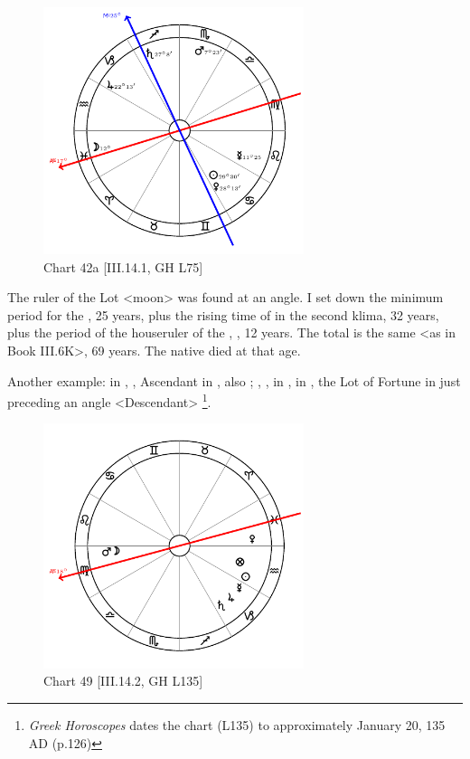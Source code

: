 \clearpage
\begin{figure}
\centering
\vspace{-20pt}
\includegraphics[width=0.68\textwidth]{charts/3_06_1}
\caption{Chart 42a [III.14.1, GH L75]}
\label{fig:chart42a}
\end{figure}  

The ruler of the Lot <moon> was found at an angle. I set down the minimum period for the \Moon, 25 years, plus the rising time of \Cancer\xspace in the second klima, 32 years, plus the period of the houseruler of the \Moon, \Jupiter, 12 years. The total is the same <as in Book III.6K>, 69
years. The native died at that age.

\newpage
Another example: \Sun\xspace in \Aquarius, \Moon, Ascendant in \Virgo, also \Mars; \Saturn, \Jupiter, \Mercury\xspace in \Capricorn, \Venus\xspace in \Pisces, the Lot of Fortune in \Aquarius\xspace just preceding an angle <Descendant>
\footnote{\textit{Greek Horoscopes} dates the chart (L135) to approximately January 20, 135 AD (p.126)}.

\clearpage
\begin{figure}
\centering
\vspace{-20pt}
\includegraphics[width=0.68\textwidth]{charts/3_14_2}
\caption{Chart 49 [III.14.2, GH L135]}
\label{fig:chart49}
\end{figure} 


